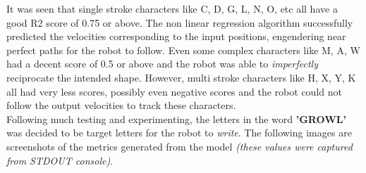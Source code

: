\documentclass[a4paper]{article}
\begin{document}
It was seen that single stroke characters like C, D, G, L, N, O, etc all have a good R2 score of 0.75 or above. The non linear regression algorithm successfully predicted the velocities corresponding to the input positions, engendering near perfect paths for the robot to follow. Even some complex characters like M, A, W had a decent score of 0.5 or above and the robot was able to {\it imperfectly} reciprocate the intended shape. However, multi stroke characters like H, X, Y, K all had very less scores, possibly even negative scores and the robot could not follow the output velocities to track these characters. \\

Following much testing and experimenting, the letters in the word \textbf{'GROWL'} was decided to be target letters for the robot to {\it write}. The following images are screenshots of the metrics generated from the model {\it (these values were captured from STDOUT console)}.\\
\end{document}
